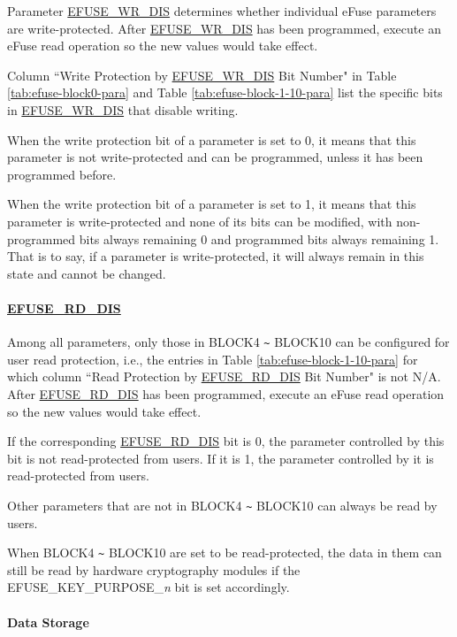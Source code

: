\documentclass[main\_\_EN.tex]{subfiles}
\begin{document}
Parameter \hyperref[fielddesc:EFUSEWRDIS]{EFUSE\_WR\_DIS} determines whether individual eFuse parameters are write-protected. After \hyperref[fielddesc:EFUSEWRDIS]{EFUSE\_WR\_DIS} has been programmed, execute an eFuse read operation so the new values would take effect.

Column ``Write Protection by \hyperref[fielddesc:EFUSEWRDIS]{EFUSE\_WR\_DIS} Bit Number" in Table  \ref{tab:efuse-block0-para} and Table \ref{tab:efuse-block-1-10-para} list the specific bits in \hyperref[fielddesc:EFUSEWRDIS]{EFUSE\_WR\_DIS} that disable writing.

When the write protection bit of a parameter is set to 0, it means that this parameter is not write-protected and can be programmed, unless it has been programmed before.  

When the write protection bit of a parameter is set to 1, it means that this parameter is write-protected and none of its bits can be modified, with non-programmed bits always remaining 0 and programmed bits always remaining 1. That is to say, if a parameter is write-protected, it will always remain in this state and cannot be changed. 

\paragraph{\hyperref[fielddesc:EFUSERDDIS]{EFUSE\_RD\_DIS}}
\label{sec:efuse-rd-dis}

Among all parameters, only those in BLOCK4 \verb+~+ BLOCK10 can be configured for user read protection, i.e., the entries in Table \ref{tab:efuse-block-1-10-para} for which column ``Read Protection by \hyperref[fielddesc:EFUSERDDIS]{EFUSE\_RD\_DIS} Bit Number" is not N/A. After \hyperref[fielddesc:EFUSERDDIS]{EFUSE\_RD\_DIS} has been programmed, execute an eFuse read operation so the new values would take effect.

If the corresponding \hyperref[fielddesc:EFUSERDDIS]{EFUSE\_RD\_DIS} bit is 0, the parameter controlled by this bit is not read-protected from users. If it is 1, the parameter controlled by it is read-protected from users.

Other parameters that are not in BLOCK4 \verb+~+ BLOCK10 can always be read by users. 

When BLOCK4 \verb+~+ BLOCK10 are set to be read-protected, the data in them can still be read by hardware cryptography modules if the EFUSE\_KEY\_PURPOSE\_\textcolor{myred}{\it{n}} bit is set accordingly.

\paragraph{Data Storage}
\label{sec:efuse-data-storage}
\end{document}
